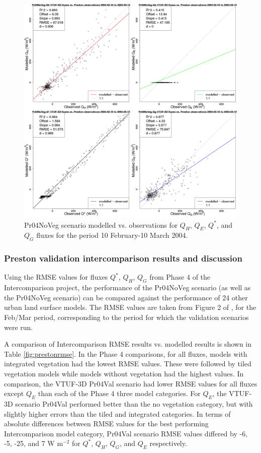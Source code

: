 \documentclass[final,3p,times,authoryear]{elsarticle}
\begin{document}
\begin{figure}[!htbp]
\includegraphics[trim = 0mm 0mm 0mm 0mm, clip, scale=0.30]{images/Pr04NoVeg-ErrorPlots.png}
\caption{Pr04NoVeg scenario modelled vs. observations for $Q_{H}$, $Q_{E}$, $Q^{*}$, and $Q_{G}$ fluxes for the period 10 February-10 March 2004. \label{fig:Prestonnovegerror}}    
\end{figure}




\subsubsection{Preston validation intercomparison results and discussion}\label{sec:interresults}

Using the RMSE values for fluxes $Q^{*}$, $Q_{H}$, $Q_{G}$ from Phase 4 of the Intercomparison project, the performance of the Pr04NoVeg scenario (as well as the Pr04NoVeg scenario) can be compared against the performance of 24 other urban land surface models. The RMSE values are taken from Figure 2 of \cite{Best2012}, for the Feb/Mar period, corresponding to the period for which the validation scenarios were run. 

A comparison of Intercomparison RMSE results vs. modelled results is shown in Table \ref{fig:prestonrmse}. In the Phase 4 comparisons, for all fluxes, models with integrated vegetation had the lowest RMSE values. These were followed by tiled vegetation models while models without vegetation had the highest values. In comparison, the VTUF-3D Pr04Val scenario had lower RMSE values for all fluxes except $Q_{E}$ than each of the Phase 4 three model categories. For $Q_{E}$, the VTUF-3D scenario Pr04Val performed better than the no vegetation category, but with slightly higher errors than the tiled and integrated categories. In terms of absolute differences between RMSE values for the best performing Intercomparison model category, Pr04Val scenario RMSE values differed by -6, -5, -25, and 7 W m$^{-2}$ for $Q^{*}$, $Q_{H}$, $Q_{G}$, and $Q_{E}$ respectively.
\end{document}
